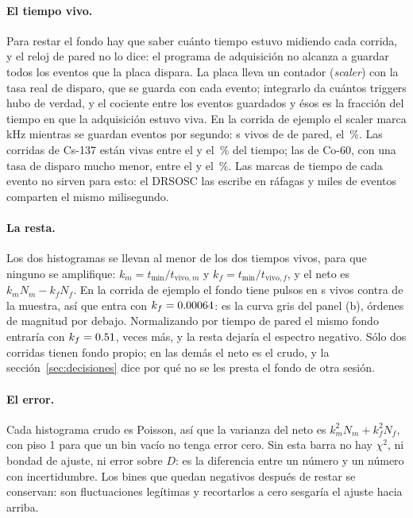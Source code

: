 \documentclass[11pt,a4paper]{article}
\begin{document}
\paragraph{El tiempo vivo.} Para restar el fondo hay que saber cuánto tiempo
estuvo midiendo cada corrida, y el reloj de pared no lo dice: el programa de
adquisición no alcanza a guardar todos los eventos que la placa dispara. La
placa lleva un contador (\emph{scaler}) con la tasa real de disparo, que se
guarda con cada evento; integrarlo da cuántos triggers hubo de verdad, y el
cociente entre los eventos guardados y ésos es la fracción del tiempo en que
la adquisición estuvo viva. En la corrida de ejemplo el scaler marca
\EjScaler{} kHz mientras se guardan \EjTasaGuardada{} eventos por segundo:
\EjTVivo{} s vivos de \EjTPared{} de pared, el \EjViva\,\%. Las corridas de
Cs-137 están vivas entre el \VivaCsMin{} y el \VivaCsMax\,\% del tiempo; las de
Co-60, con una tasa de disparo mucho menor, entre el \VivaCoMin{} y el
\VivaCoMax\,\%. Las marcas de tiempo de cada evento no sirven para esto: el
DRSOSC las escribe en ráfagas y miles de eventos comparten el mismo
milisegundo.

\paragraph{La resta.} Los dos histogramas se llevan al menor de los dos
tiempos vivos, para que ninguno se amplifique: $k_m = t_{\min}/t_{\text{vivo},m}$ y
$k_f = t_{\min}/t_{\text{vivo},f}$, y el neto es $k_m N_m - k_f N_f$. En la
corrida de ejemplo el fondo tiene \EjNFondo{} pulsos en \EjTVivoFondo{} s
vivos contra \EjTVivo{} de la muestra, así que entra con $k_f = 0.00064$: es la
curva gris del panel (b), órdenes de magnitud por debajo. Normalizando por
tiempo de pared el mismo fondo entraría con $k_f = 0.51$, \EjFactorVivo{}
veces más, y la resta dejaría el espectro negativo. Sólo dos corridas tienen fondo propio; en las demás el neto
es el crudo, y la sección~\ref{sec:decisiones} dice por qué no se les presta
el fondo de otra sesión.

\paragraph{El error.} Cada histograma crudo es Poisson, así que la varianza del
neto es $k_m^2 N_m + k_f^2 N_f$, con piso 1 para que un bin vacío no tenga
error cero. Sin esta barra no hay $\chi^2$, ni bondad de ajuste, ni error
sobre $D$: es la diferencia entre un número y un número con incertidumbre.
Los bines que quedan negativos después de restar se conservan: son
fluctuaciones legítimas y recortarlos a cero sesgaría el ajuste hacia arriba.
\end{document}
